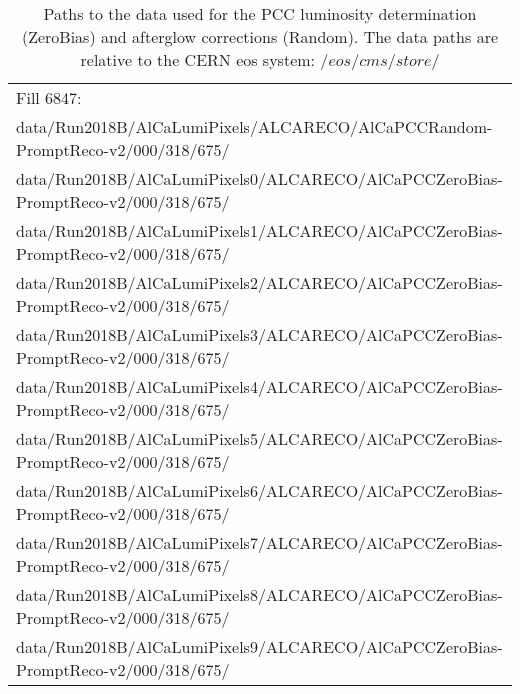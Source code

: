\clearpage
\begin{table}[h]
  \caption{Paths to the data used for the PCC luminosity determination (ZeroBias) and afterglow corrections (Random).
  The data paths are relative to the CERN eos system: $/eos/cms/store/$
  }
  \label{tab:datapaths}
  \footnotesize
  \begin{tabular}{l}
    \hline\hline
    Fill 6847:\\
data/Run2018B/AlCaLumiPixels/ALCARECO/AlCaPCCRandom-PromptReco-v2/000/318/675/\\ %
data/Run2018B/AlCaLumiPixels0/ALCARECO/AlCaPCCZeroBias-PromptReco-v2/000/318/675/\\ %
data/Run2018B/AlCaLumiPixels1/ALCARECO/AlCaPCCZeroBias-PromptReco-v2/000/318/675/\\ %
data/Run2018B/AlCaLumiPixels2/ALCARECO/AlCaPCCZeroBias-PromptReco-v2/000/318/675/\\ %
data/Run2018B/AlCaLumiPixels3/ALCARECO/AlCaPCCZeroBias-PromptReco-v2/000/318/675/\\ %
data/Run2018B/AlCaLumiPixels4/ALCARECO/AlCaPCCZeroBias-PromptReco-v2/000/318/675/\\ %
data/Run2018B/AlCaLumiPixels5/ALCARECO/AlCaPCCZeroBias-PromptReco-v2/000/318/675/\\ %
data/Run2018B/AlCaLumiPixels6/ALCARECO/AlCaPCCZeroBias-PromptReco-v2/000/318/675/\\ %
data/Run2018B/AlCaLumiPixels7/ALCARECO/AlCaPCCZeroBias-PromptReco-v2/000/318/675/\\ %
data/Run2018B/AlCaLumiPixels8/ALCARECO/AlCaPCCZeroBias-PromptReco-v2/000/318/675/\\ %
data/Run2018B/AlCaLumiPixels9/ALCARECO/AlCaPCCZeroBias-PromptReco-v2/000/318/675/\\ %

\end{tabular}
\end{table}
